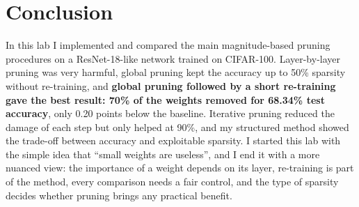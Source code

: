 \documentclass[11pt,a4paper]{article}
\begin{document}
\section{Conclusion}

In this lab I implemented and compared the main magnitude-based pruning procedures on a ResNet-18-like network trained on CIFAR-100. Layer-by-layer pruning was very harmful, global pruning kept the accuracy up to 50\% sparsity without re-training, and \textbf{global pruning followed by a short re-training gave the best result: 70\% of the weights removed for 68.34\% test accuracy}, only 0.20 points below the baseline. Iterative pruning reduced the damage of each step but only helped at 90\%, and my structured method showed the trade-off between accuracy and exploitable sparsity. I started this lab with the simple idea that ``small weights are useless'', and I end it with a more nuanced view: the importance of a weight depends on its layer, re-training is part of the method, every comparison needs a fair control, and the type of sparsity decides whether pruning brings any practical benefit.
\end{document}
